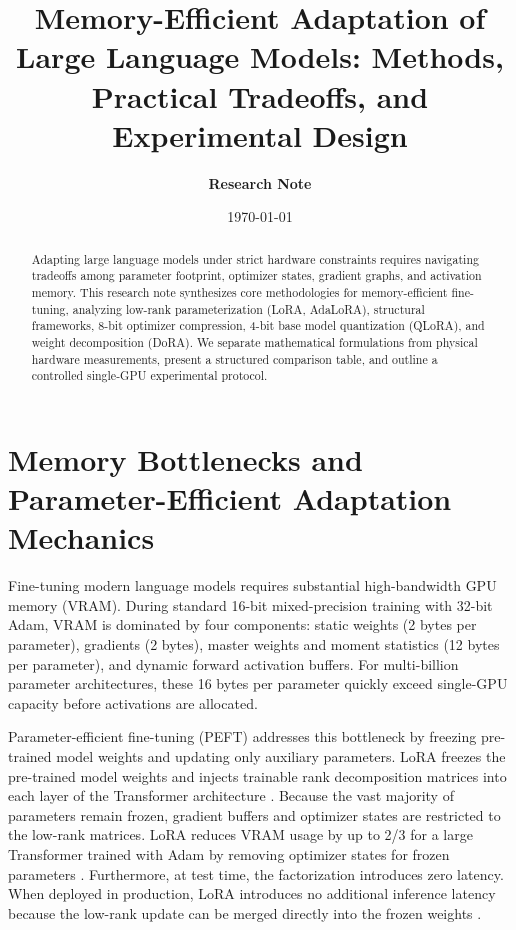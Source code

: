\documentclass[11pt,a4paper]{article}
\title{\textbf{Memory-Efficient Adaptation of Large Language Models: Methods, Practical Tradeoffs, and Experimental Design}}
\author{\textbf{Research Note}}
\date{\today}
\begin{document}
\maketitle

\begin{abstract}
Adapting large language models under strict hardware constraints requires navigating tradeoffs among parameter footprint, optimizer states, gradient graphs, and activation memory. This research note synthesizes core methodologies for memory-efficient fine-tuning, analyzing low-rank parameterization (LoRA, AdaLoRA), structural frameworks, 8-bit optimizer compression, 4-bit base model quantization (QLoRA), and weight decomposition (DoRA). We separate mathematical formulations from physical hardware measurements, present a structured comparison table, and outline a controlled single-GPU experimental protocol.
\end{abstract}

\section{Memory Bottlenecks and Parameter-Efficient Adaptation Mechanics}

Fine-tuning modern language models requires substantial high-bandwidth GPU memory (VRAM). During standard 16-bit mixed-precision training with 32-bit Adam, VRAM is dominated by four components: static weights (2 bytes per parameter), gradients (2 bytes), master weights and moment statistics (12 bytes per parameter), and dynamic forward activation buffers. For multi-billion parameter architectures, these 16 bytes per parameter quickly exceed single-GPU capacity before activations are allocated.

Parameter-efficient fine-tuning (PEFT) addresses this bottleneck by freezing pre-trained model weights and updating only auxiliary parameters. LoRA freezes the pre-trained model weights and injects trainable rank decomposition matrices into each layer of the Transformer architecture \cite{hu2021lora}. Because the vast majority of parameters remain frozen, gradient buffers and optimizer states are restricted to the low-rank matrices. LoRA reduces VRAM usage by up to 2/3 for a large Transformer trained with Adam by removing optimizer states for frozen parameters \cite{hu2021lora}. Furthermore, at test time, the factorization introduces zero latency. When deployed in production, LoRA introduces no additional inference latency because the low-rank update can be merged directly into the frozen weights \cite{hu2021lora}.
\end{document}
